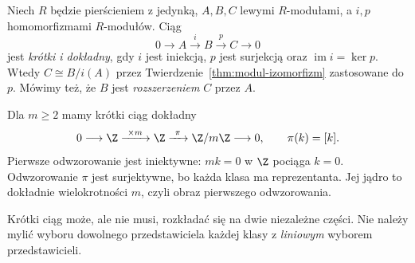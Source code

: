 \begin{definicja}
\label{def:krotki-ciag}
Niech $R$ będzie pierścieniem z jedynką,
$A,B,C$ lewymi $R$-modułami, a $i,p$
homomorfizmami $R$-modułów. Ciąg
\begin{equation}\label{eq:krotki-ciag}
 0\longrightarrow A\xrightarrow{i}B
   \xrightarrow{p}C\longrightarrow0
\end{equation}
jest \emph{krótki i dokładny}, gdy $i$ jest
iniekcją, $p$ jest surjekcją oraz
$\operatorname{im}i=\ker p$.
Wtedy $C\cong B/i(A)$ przez
Twierdzenie~\ref{thm:modul-izomorfizm}
zastosowane do $p$. Mówimy też,
że $B$ jest \emph{rozszerzeniem} $C$ przez $A$.
\end{definicja}

\begin{przyklad}
\label{prz:ses-mod-m}
Dla $m\geq2$ mamy krótki ciąg dokładny
\[
 0\longrightarrow\Z\xrightarrow{\ \times m\ }\Z
   \xrightarrow{\ \pi\ }\Z/m\Z\longrightarrow0,
 \qquad \pi(k)=[k].
\]
Pierwsze odwzorowanie jest iniektywne: $mk=0$
w $\Z$ pociąga $k=0$. Odwzorowanie $\pi$ jest
surjektywne, bo każda klasa ma reprezentanta.
Jej jądro to dokładnie wielokrotności $m$,
czyli obraz pierwszego odwzorowania.
\end{przyklad}

Krótki ciąg może, ale nie musi, rozkładać się
na dwie niezależne części. Nie należy mylić
wyboru dowolnego przedstawiciela każdej klasy
z \emph{liniowym} wyborem przedstawicieli.

